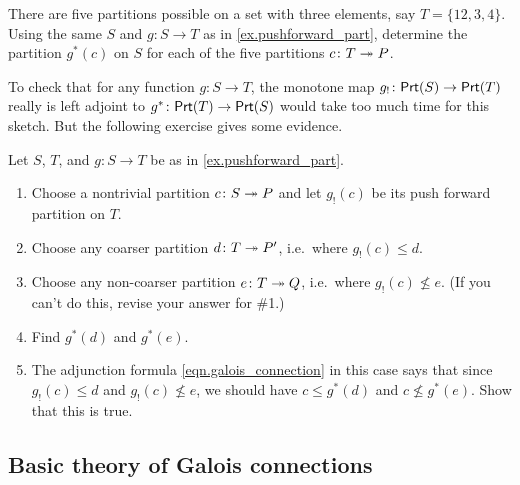 \documentclass[7Sketches]{subfiles}
\begin{document}
\begin{exercise}%
\label{exc.pullback_parts}
There are five partitions possible on a set with three elements, say $T=\{12,3,4\}$. Using the same $S$ and $g\colon S\to T$ as in \cref{ex.pushforward_part}, determine the partition $g^*(c)$ on $S$ for each of the five partitions $c\colon T\twoheadrightarrow P$.
\end{exercise}

To check that for any function $g\colon S\to T$, the monotone map
$g_!\colon\mathsf{Prt}(S)\to \mathsf{Prt}(T)$ really is left adjoint to $g^*\colon\mathsf{Prt}(T)\to \mathsf{Prt}(S)$ would take too much time for this sketch. But the following exercise gives some evidence.

\begin{exercise}%
\label{exc.parts_adjunction}
Let $S$, $T$, and $g\colon S\to T$ be as in \cref{ex.pushforward_part}.
\begin{enumerate}
	\item Choose a nontrivial partition $c\colon S\twoheadrightarrow P$ and let $g_!(c)$ be its push forward partition on $T$.
	\item Choose any coarser partition $d\colon T\twoheadrightarrow P'$, i.e.\ where $g_!(c)\leq d$.
	\item Choose any non-coarser partition $e\colon T\twoheadrightarrow Q$, i.e.\ where $g_!(c)\not\leq e$. (If you can't do this, revise your answer for \#1.)
	\item Find $g^*(d)$ and $g^*(e)$.
	\item The adjunction formula \cref{eqn.galois_connection} in this case says that since $g_!(c)\leq d$ and $g_!(c)\not\leq e$, we should have $c\leq g^*(d)$ and $c\not\leq g^*(e)$. Show that this is true.
\qedhere
\end{enumerate}
\end{exercise}
%

\subsection{Basic theory of Galois connections}
\end{document}
